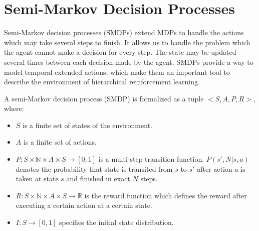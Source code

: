 
\section{Semi-Markov Decision Processes}
\label{se:SMDP}

Semi-Markov decision processes (SMDPs) \cite{Puterman94} extend MDPs to handle the actions 
which may take several steps to finish. It allows us to handle
the problem which the agent 
cannot make a decision for every step. 
The state may be updated several times between
each decision made by the agent.  
SMDPs provide a way to model temporal extended actions, which
make them an important tool to describe the environment of hierarchical 
reinforcement learning.

\begin{definition} A semi-Markov decision process (SMDP) is formalized as a tuple $<S, A, P, R>$, where:
\begin{itemize}
    \item $S$ is a finite set of states of the environment.
    \item $A$ is a finite set of actions.
    \item $P:S \times \mathbb{N} \times A \times S \rightarrow [0, 1]$ is a multi-step transition function.
        $P(s', N | s, a)$ denotes the probability that state is transited from  $s$ to $s'$
        after action $a$ is taken at state $s$ and finished in exact $N$ steps.
    \item $R:S \times \mathbb{N} \times A \times S \rightarrow \mathbb{R}$ is the reward function which defines the reward after executing a certain action at a certain state.
    \item $I:S \rightarrow [0, 1]$ specifies the initial state distribution.
 \end{itemize}
\end{definition}

